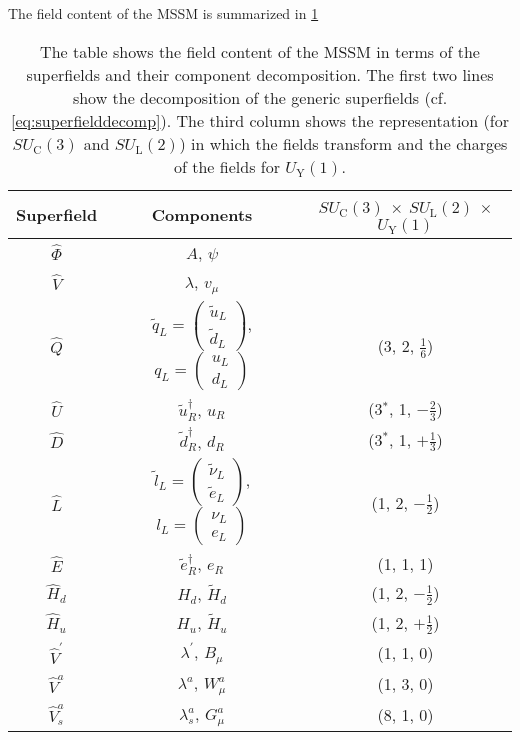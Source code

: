 The field content of the MSSM is summarized in \ref{tab:MSSMfieldcontent}
\begin{table}
\begin{center}
\begin{tabular}{c|c|c}\label{tab:MSSMfieldcontent}
Superfield & Components & $SU_\mathrm{C}(3)$ $\times$ $SU_\mathrm{L}(2)$ $\times$ $U_\mathrm{Y}(1)$\\
\hline
$\hat{\Phi}$ & $A$, $\psi$ & \\
$\hat{V}$ & $\lambda$, $v_\mu$ \\
$\hat{Q}$ & $\tilde{q}_L = \begin{pmatrix}
\tilde{u}_L \\
\tilde{d}_L
\end{pmatrix}$, $q_L = \begin{pmatrix}
u_L \\
d_L
\end{pmatrix}$ & (3, 2, $\frac{1}{6}$)\\
$\hat{U}$ & $\tilde{u}_R^\dagger$, $u_R$ & (3$^\ast$, 1, $-\frac{2}{3}$)\\
$\hat{D}$ & $\tilde{d}_R^\dagger$, $d_R$ & (3$^\ast$, 1, $+\frac{1}{3}$)\\
$\hat{L}$ & $\tilde{l}_L = \begin{pmatrix}
\tilde{\nu}_L \\
\tilde{e}_L
\end{pmatrix}$, $l_L = \begin{pmatrix}
\nu_L \\
e_L
\end{pmatrix}$ & (1, 2, $-\frac{1}{2}$)\\
$\hat{E}$ & $\tilde{e}_R^\dagger$, $e_R$ & (1, 1, 1)\\
$\hat{H}_d$ & $H_d$, $\tilde{H}_d$ & (1, 2, $-\frac{1}{2}$)\\
$\hat{H}_u$ & $H_u$, $\tilde{H}_u$ & (1, 2, $+\frac{1}{2}$)\\
$\hat{V}^\prime$ & $\lambda^\prime$, $B_\mu$ & (1, 1, 0)\\
$\hat{V}^a$ & $\lambda^a$, $W_\mu^a$ & (1, 3, 0)\\
$\hat{V}_s^a$ & $\lambda_s^a$, $G_\mu^a$ & (8, 1, 0)\\
\end{tabular}
\caption{The table shows the field content of the MSSM in terms of the superfields and their component decomposition. The first two lines show the decomposition of the generic superfields (cf. \ref{eq:superfielddecomp}).\newline
The third column shows the representation (for $SU_\mathrm{C}(3)$ and $SU_\mathrm{L}(2)$) in which the fields transform and the charges of the fields for $U_\mathrm{Y}(1)$.}\label{tab:MSSMfieldcontent}
\end{center}
\end{table}